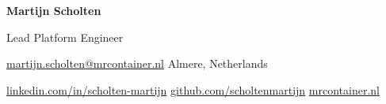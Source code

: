 \begin{center}
{\Huge\bfseries\color{primary}Martijn Scholten}

\vspace{0.3cm}
{\large Lead Platform Engineer}

\vspace{0.4cm}
 \phonenumber \quad
{} \href{mailto:martijn.scholten@mrcontainer.nl}{martijn.scholten@mrcontainer.nl} \quad
{} Almere, Netherlands

\vspace{0.2cm}
 \href{https://linkedin.com/in/scholten-martijn}{linkedin.com/in/scholten-martijn} \quad
{} \href{https://github.com/scholtenmartijn}{github.com/scholtenmartijn} \quad
{} \href{https://mrcontainer.nl}{mrcontainer.nl}
\end{center}
